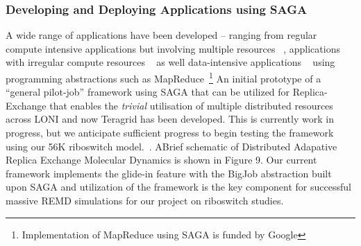 \documentclass[a4paper,10pt]{article}
\begin{document}
\subsubsection*{Developing and Deploying Applications using SAGA}

A wide range of applications have been developed -- ranging from regular compute intensive applications but involving multiple resources ~\cite{saga_escience07}, applications with irregular compute resources ~\cite{teragrid08} as well data-intensive applications ~\cite{sagamapreduce} using programming abstractions such as MapReduce~\footnote{Implementation of MapReduce using SAGA is funded by Google} An initial prototype of a ``general pilot-job'' framework using SAGA that can be utilized for Replica-Exchange that enables the {\it trivial} utilisation of multiple distributed resources across LONI and now Teragrid has been developed. This is currently work in progress, but we anticipate sufficient progress to begin testing the framework using our 56K riboswitch model.~\cite{REMD-PhilTranA2009}. ABrief schematic of Distributed Adapative Replica Exchange Molecular Dynamics is shown in Figure 9.  Our current framework implements the glide-in feature with the BigJob abstraction built upon SAGA and utilization of the framework is the key component for successful massive REMD simulations for our project on riboswitch studies.

\end{document}
